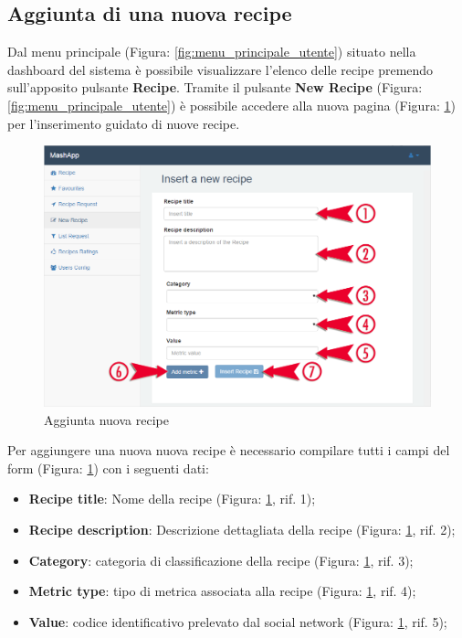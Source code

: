 	\subsection{Aggiunta di una nuova recipe}
		Dal menu principale (Figura: \ref{fig:menu_principale_utente}) situato nella dashboard\gloss{} del sistema è possibile visualizzare l'elenco delle recipe\gloss{} premendo sull'apposito pulsante \textbf{Recipe}.\newline
		Tramite il pulsante \textbf{New Recipe} (Figura: \ref{fig:menu_principale_utente}) è possibile accedere alla nuova pagina (Figura: \ref{fig:aggiunta_nuova_recipe}) per l'inserimento guidato di nuove recipe\gloss{}.
		\begin{figure}[H]
			\centering
			\centerline{\includegraphics[width=14cm]{images/nuova_ricetta.png}}
			\caption{Aggiunta nuova recipe}
			\label{fig:aggiunta_nuova_recipe}
		\end{figure}
		Per aggiungere una nuova nuova recipe\gloss{} è necessario compilare tutti i campi del form\gloss{} (Figura: \ref{fig:aggiunta_nuova_recipe}) con i seguenti dati:
		\begin{itemize}
			\item \textbf{Recipe title}: Nome della recipe\gloss{} (Figura: \ref{fig:aggiunta_nuova_recipe}, rif. 1);
			\item \textbf{Recipe description}: Descrizione dettagliata della recipe\gloss{} (Figura: \ref{fig:aggiunta_nuova_recipe}, rif. 2);
			\item \textbf{Category}: categoria di classificazione della recipe\gloss{} (Figura: \ref{fig:aggiunta_nuova_recipe}, rif. 3);
			\item \textbf{Metric type}: tipo di metrica associata alla recipe\gloss{} (Figura: \ref{fig:aggiunta_nuova_recipe}, rif. 4);
			\item \textbf{Value}: codice identificativo prelevato dal social network (Figura: \ref{fig:aggiunta_nuova_recipe}, rif. 5);
		\end{itemize}
